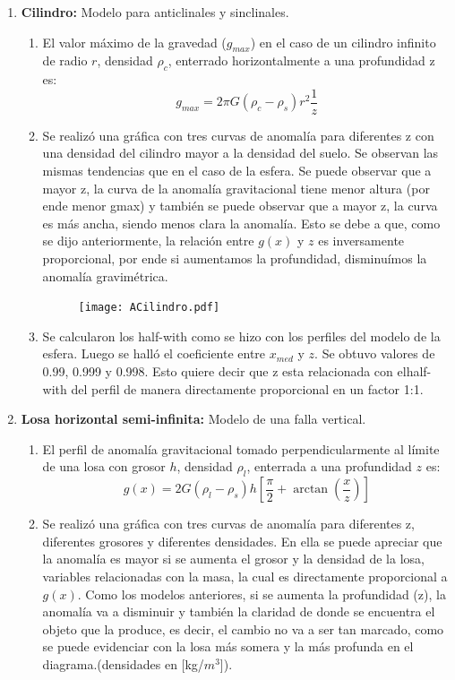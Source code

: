 \documentclass{article}
\begin{document}
\begin{enumerate}
\item {\bf Cilindro:} Modelo para anticlinales y sinclinales.
	\begin{enumerate}
	\item El valor m\'aximo de la gravedad ($g_{max}$) en el caso de un cilindro infinito de radio $r$, densidad $\rho_c$, enterrado horizontalmente a una profundidad z es: 
	\begin{equation*}
	g_{max} = 2\pi G(\rho_c-\rho_s)r^{2}\frac{1}{z}
	\end{equation*}
	\item Se realiz\'o una gr\'afica con tres curvas de anomal\'ia para diferentes z con una densidad del cilindro mayor a la densidad del suelo. Se observan las mismas tendencias que en el caso de la esfera. Se puede observar que a mayor z, la curva de la anomal\'ia gravitacional tiene menor altura (por ende menor gmax) y tambi\'en se puede observar que a mayor z, la curva es m\'as ancha, siendo menos clara la anomal\'ia. Esto se debe a que, como se dijo anteriormente, la relaci\'on entre $g(x)$ y $z$ es inversamente proporcional, por ende si aumentamos la profundidad, disminu\'imos la anomal\'ia gravim\'etrica.
	\begin{figure}[H]\centering
	\texttt{[image: ACilindro.pdf]}
	\end{figure}
	\item Se calcularon los half-with como se hizo con los perfiles del modelo de la esfera. Luego se hall\'o el coeficiente entre $x_{med}$ y $z$. Se obtuvo valores de 0.99, 0.999 y 0.998. Esto quiere decir que z esta relacionada con elhalf-with del perfil de manera directamente proporcional en un factor 1:1.
	\end{enumerate}
\item {\bf Losa horizontal semi-infinita:} Modelo de una falla vertical.
	\begin{enumerate}
	\item El perfil de anomal\'ia gravitacional tomado perpendicularmente al l\'imite de una losa con grosor $h$, densidad $\rho_l$, enterrada a una profundidad $z$ es:
	\begin{equation*}
	g(x) = 2G(\rho_l-\rho_s)h[\frac{\pi}{2} + \arctan(\frac{x}{z})]
	\end{equation*}
	\item Se realiz\'o una gr\'afica con tres curvas de anomal\'ia para diferentes z, diferentes grosores y diferentes densidades. En ella se puede apreciar que la anomal\'ia es mayor si se aumenta el grosor y la densidad de la losa, variables relacionadas con la masa, la cual es directamente proporcional a $g(x)$. Como los modelos anteriores, si se aumenta la profundidad (z), la anomal\'ia va a disminuir y tambi\'en la claridad de donde se encuentra el objeto que la produce, es decir, el cambio no va a ser tan marcado, como se puede evidenciar con la losa m\'as somera y la m\'as profunda en el diagrama.(densidades en [kg/$m^{3}$]).

\end{enumerate}
\end{enumerate}
\end{document}
